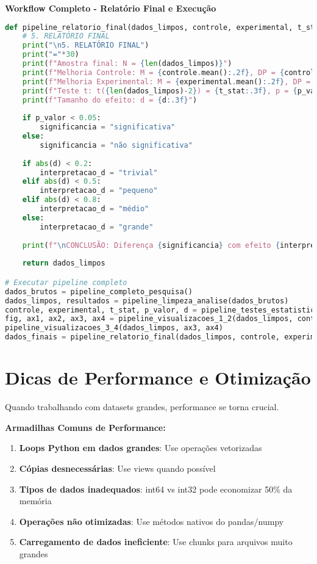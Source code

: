 \begin{examplebox}
\textbf{Workflow Completo - Relatório Final e Execução}

\begin{lstlisting}[language=Python]
def pipeline_relatorio_final(dados_limpos, controle, experimental, t_stat, p_valor, d):
    # 5. RELATÓRIO FINAL
    print("\n5. RELATÓRIO FINAL")
    print("="*30)
    print(f"Amostra final: N = {len(dados_limpos)}")
    print(f"Melhoria Controle: M = {controle.mean():.2f}, DP = {controle.std():.2f}")
    print(f"Melhoria Experimental: M = {experimental.mean():.2f}, DP = {experimental.std():.2f}")
    print(f"Teste t: t({len(dados_limpos)-2}) = {t_stat:.3f}, p = {p_valor:.3f}")
    print(f"Tamanho do efeito: d = {d:.3f}")
    
    if p_valor < 0.05:
        significancia = "significativa"
    else:
        significancia = "não significativa"
    
    if abs(d) < 0.2:
        interpretacao_d = "trivial"
    elif abs(d) < 0.5:
        interpretacao_d = "pequeno"
    elif abs(d) < 0.8:
        interpretacao_d = "médio"
    else:
        interpretacao_d = "grande"
    
    print(f"\nCONCLUSÃO: Diferença {significancia} com efeito {interpretacao_d}")
    
    return dados_limpos

# Executar pipeline completo
dados_brutos = pipeline_completo_pesquisa()
dados_limpos, resultados = pipeline_limpeza_analise(dados_brutos)
controle, experimental, t_stat, p_valor, d = pipeline_testes_estatisticos(dados_limpos)
fig, ax1, ax2, ax3, ax4 = pipeline_visualizacoes_1_2(dados_limpos, controle, experimental)
pipeline_visualizacoes_3_4(dados_limpos, ax3, ax4)
dados_finais = pipeline_relatorio_final(dados_limpos, controle, experimental, t_stat, p_valor, d)
\end{lstlisting}
\end{examplebox}

\section{Dicas de Performance e Otimização}

Quando trabalhando com datasets grandes, performance se torna crucial.

\begin{warningbox}
\textbf{Armadilhas Comuns de Performance:}

\begin{enumerate}
    \item \textbf{Loops Python em dados grandes}: Use operações vetorizadas
    \item \textbf{Cópias desnecessárias}: Use views quando possível
    \item \textbf{Tipos de dados inadequados}: int64 vs int32 pode economizar 50\% da memória
    \item \textbf{Operações não otimizadas}: Use métodos nativos do pandas/numpy
    \item \textbf{Carregamento de dados ineficiente}: Use chunks para arquivos muito grandes
\end{enumerate}
\end{warningbox}

